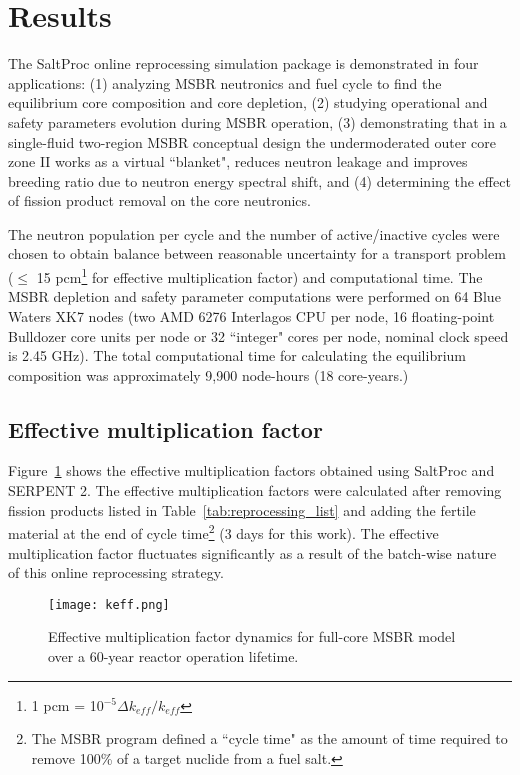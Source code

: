 \section{Results}
The SaltProc online reprocessing simulation package is demonstrated in four 
applications: (1) analyzing  \gls{MSBR} neutronics and fuel cycle to find the 
equilibrium core composition and core depletion, (2) studying operational and 
safety parameters evolution during \gls{MSBR} operation, (3) demonstrating that 
in a single-fluid two-region \gls{MSBR} conceptual design the undermoderated 
outer core zone II works as a virtual ``blanket", reduces neutron leakage and 
improves breeding ratio due to neutron energy spectral shift, and (4) 
determining the effect of fission product removal on the core neutronics.

The neutron population per cycle and the number of active/inactive cycles were 
chosen to obtain balance between reasonable uncertainty for a transport problem 
($\leq$ 15 pcm\footnote{ 1 pcm = 10$^{-5}\Delta k_{eff}/k_{eff}$} for effective 
multiplication factor) and computational time. The \gls{MSBR} depletion and 
safety parameter computations were performed on 64 Blue Waters XK7 nodes (two 
AMD 6276 Interlagos CPU per node, 16 floating-point Bulldozer core units per 
node or 32 ``integer" cores per node, nominal clock speed is 2.45 GHz). The 
total computational time for calculating the equilibrium composition was 
approximately 9,900 node-hours (18 core-years.)

\subsection{Effective multiplication factor}
Figure~\ref{fig:keff} shows the effective multiplication factors 
obtained using SaltProc and SERPENT 2. The effective multiplication factors were 
calculated after removing fission products listed in 
Table~\ref{tab:reprocessing_list} and adding the fertile material at the end of 
cycle time\footnote{ The \gls{MSBR} program defined a ``cycle time" as the 
        amount of time required to remove 100\% of a target nuclide from a fuel 
salt.} (3 days for this work). The effective multiplication 
factor fluctuates significantly as a result of the batch-wise nature of this 
online reprocessing strategy. 

\begin{figure}[ht!] 
  \centering
  \texttt{[image: keff.png]}
  \caption{Effective multiplication factor dynamics for full-core \gls{MSBR} 
  model over a 60-year reactor operation lifetime.}
  \label{fig:keff}
\end{figure}

